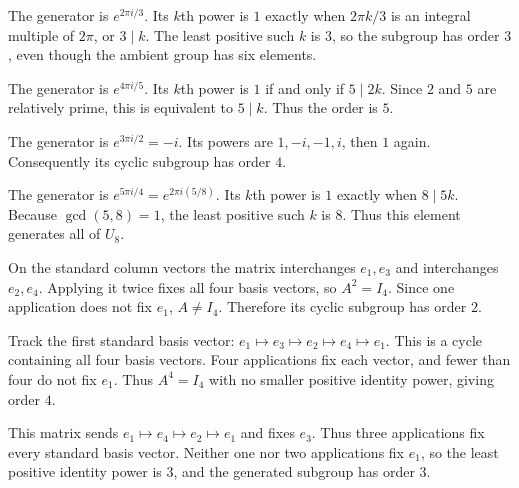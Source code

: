 
The generator is $e^{2\pi i/3}$. Its $k$th power is $1$ exactly when $2\pi k/3$ is an integral multiple of $2\pi$, or $3\mid k$. The least positive such $k$ is $3$, so the subgroup has order $3$, even though the ambient group has six elements.


The generator is $e^{4\pi i/5}$. Its $k$th power is $1$ if and only if $5\mid2k$. Since $2$ and $5$ are relatively prime, this is equivalent to $5\mid k$. Thus the order is $5$.


The generator is $e^{3\pi i/2}=-i$. Its powers are $1,-i,-1,i$, then $1$ again. Consequently its cyclic subgroup has order $4$.


The generator is $e^{5\pi i/4}=e^{2\pi i(5/8)}$. Its $k$th power is $1$ exactly when $8\mid5k$. Because $\gcd(5,8)=1$, the least positive such $k$ is $8$. Thus this element generates all of $U_8$.


On the standard column vectors the matrix interchanges $e_1,e_3$ and interchanges $e_2,e_4$. Applying it twice fixes all four basis vectors, so $A^2=I_4$. Since one application does not fix $e_1$, $A\ne I_4$. Therefore its cyclic subgroup has order $2$.


Track the first standard basis vector: $e_1\mapsto e_3\mapsto e_2\mapsto e_4\mapsto e_1$. This is a cycle containing all four basis vectors. Four applications fix each vector, and fewer than four do not fix $e_1$. Thus $A^4=I_4$ with no smaller positive identity power, giving order $4$.


This matrix sends $e_1\mapsto e_4\mapsto e_2\mapsto e_1$ and fixes $e_3$. Thus three applications fix every standard basis vector. Neither one nor two applications fix $e_1$, so the least positive identity power is $3$, and the generated subgroup has order $3$.


